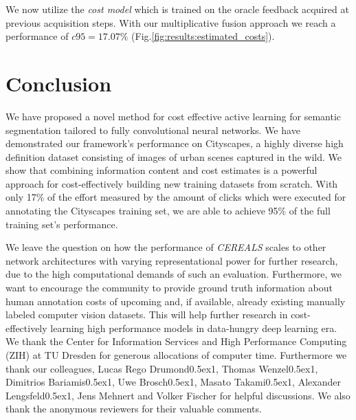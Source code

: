 \documentclass{bmvc2k}
\begin{document}
We now utilize the \textit{cost model} which is trained on the oracle feedback acquired at previous acquisition steps. With our multiplicative fusion approach we reach a performance of $c95=17.07\%$  (Fig.\ref{fig:results:estimated_costs}).

\label{sec:results}
\section{Conclusion}

We have proposed a novel method for cost effective active learning for semantic segmentation tailored to fully convolutional neural networks. We have demonstrated our framework's performance on Cityscapes, a highly diverse high definition dataset consisting of images of urban scenes captured in the wild. We show that combining information content and cost estimates is a powerful approach for cost-effectively building new training datasets from scratch. With only 17\% of the effort measured by the amount of clicks which were executed for annotating the Cityscapes training set, we are able to achieve 95\% of the full training set's performance.

We leave the question on how the performance of \textit{CEREALS} scales to other network architectures with varying representational power for further research, due to the high computational demands of such an evaluation. Furthermore, we want to encourage the community to provide ground truth information about human annotation costs of upcoming and, if available, already existing manually labeled computer vision datasets. This will help further research in cost-effectively learning high performance models in data-hungry deep learning era.
We thank the Center for Information Services and High Performance Computing (ZIH) at TU Dresden for generous allocations of computer time. Furthermore we thank our colleagues, Lucas Rego Drumond\raise0.5ex\hbox{1}, Thomas Wenzel\raise0.5ex\hbox{1}, Dimitrios Bariamis\raise0.5ex\hbox{1}, Uwe Brosch\raise0.5ex\hbox{1}, Masato Takami\raise0.5ex\hbox{1}, Alexander Lengsfeld\raise0.5ex\hbox{1}, Jens Mehnert and Volker Fischer for helpful discussions. We also thank the anonymous reviewers for their valuable comments. 

\newpage\label{sec:conclusion}



\end{document}
